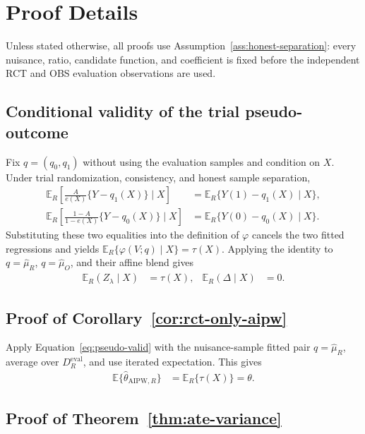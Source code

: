 \section{Proof Details}
\label{app:proofs}

Unless stated otherwise, all proofs use Assumption~\ref{ass:honest-separation}:
every nuisance, ratio, candidate function, and coefficient is fixed before the
independent RCT and OBS evaluation observations are used.

\subsection{Conditional validity of the trial pseudo-outcome}

Fix $q=(q_0,q_1)$ without using the evaluation samples and condition on
$X$. Under trial randomization, consistency, and honest sample separation,
\begin{align}
\mathbb E_R\left[\frac{A}{e(X)}\{Y-q_1(X)\}\mid X\right]
&=\mathbb E_R\{Y(1)-q_1(X)\mid X\},
\\
\mathbb E_R\left[\frac{1-A}{1-e(X)}\{Y-q_0(X)\}\mid X\right]
&=\mathbb E_R\{Y(0)-q_0(X)\mid X\}.
\end{align}
Substituting these two equalities into the definition of $\varphi$ cancels the
two fitted regressions and yields
$\mathbb E_R\{\varphi(V;q)\mid X\}=\tau(X)$.  Applying the identity to
$q=\widehat\mu_R$, $q=\widehat\mu_O$, and their affine blend gives
\begin{align}
\mathbb E_R(Z_\lambda\mid X)&=\tau(X),
&
\mathbb E_R(\Delta\mid X)&=0.
\end{align}

\subsection{Proof of Corollary~\ref{cor:rct-only-aipw}}

Apply Equation~\eqref{eq:pseudo-valid} with the nuisance-sample fitted pair
$q=\widehat\mu_R$, average over $D_R^{\mathrm{eval}}$, and use
iterated expectation. This gives
\begin{align*}
\mathbb E\{\widehat\theta_{\mathrm{AIPW},R}\}
&=\mathbb E_R\{\tau(X)\}=\theta.
\end{align*}

\subsection{Proof of Theorem~\ref{thm:ate-variance}}

